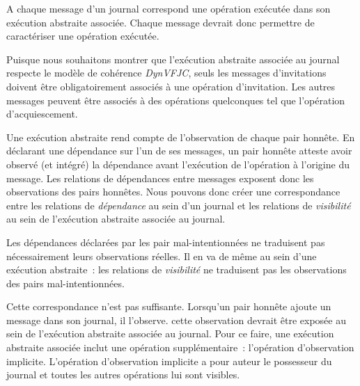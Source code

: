 A chaque message d'un journal correspond une opération exécutée dans son exécution abstraite associée.
Chaque message devrait donc permettre de caractériser une opération exécutée.

Puisque nous souhaitons montrer que l'exécution abstraite associée au journal respecte le modèle de cohérence \emph{DynVFJC}, seuls les messages d'invitations doivent être obligatoirement associés à une opération d'invitation.
Les autres messages peuvent être associés à des opérations quelconques tel que l'opération d'acquiescement.

Une exécution abstraite rend compte de l'observation de chaque pair honnête.
En déclarant une dépendance sur l'un de ses messages, un pair honnête atteste avoir observé (et intégré) la dépendance avant l'exécution de l'opération à l'origine du message.
Les relations de dépendances entre messages exposent donc les observations des pairs honnêtes.
Nous pouvons donc créer une correspondance entre les relations de \emph{dépendance} au sein d'un journal et les relations de \emph{visibilité} au sein de l'exécution abstraite associée au journal.

Les dépendances déclarées par les pair mal-intentionnées ne traduisent pas nécessairement leurs observations réelles.
Il en va de même au sein d'une exécution abstraite~: les relations de \emph{visibilité} ne traduisent pas les observations des pairs mal-intentionnées.

Cette correspondance n'est pas suffisante.
Lorsqu'un pair honnête ajoute un message dans son journal, il l'observe.
cette observation devrait être exposée au sein de l'exécution abstraite associée au journal.
Pour ce faire, une exécution abstraite associée inclut une opération supplémentaire~: l'opération d'observation implicite.
L'opération d'observation implicite a pour auteur le possesseur du journal et toutes les autres opérations lui sont visibles.


